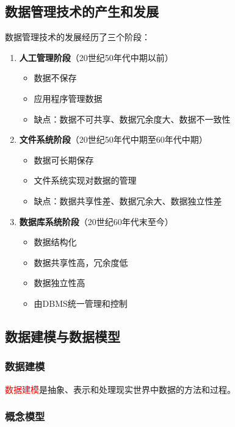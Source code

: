 \documentclass{../../note}
\begin{document}
\subsection{数据管理技术的产生和发展}

数据管理技术的发展经历了三个阶段：

\begin{enumerate}
  \item \textbf{人工管理阶段}（20世纪50年代中期以前）
    \begin{itemize}
      \item 数据不保存
      \item 应用程序管理数据
      \item 缺点：数据不可共享、数据冗余度大、数据不一致性
    \end{itemize}

  \item \textbf{文件系统阶段}（20世纪50年代中期至60年代中期）
    \begin{itemize}
      \item 数据可长期保存
      \item 文件系统实现对数据的管理
      \item 缺点：数据共享性差、数据冗余大、数据独立性差
    \end{itemize}

  \item \textbf{数据库系统阶段}（20世纪60年代末至今）
    \begin{itemize}
      \item 数据结构化
      \item 数据共享性高，冗余度低
      \item 数据独立性高
      \item 由DBMS统一管理和控制
    \end{itemize}
\end{enumerate}

\subsection{数据建模与数据模型}

\subsubsection{数据建模}

\textcolor{red}{数据建模}是抽象、表示和处理现实世界中数据的方法和过程。

\subsubsection{概念模型}
\end{document}

